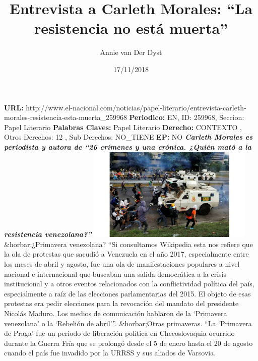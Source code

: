 \documentclass{article}%
\title{\textbf{Entrevista a Carleth Morales: “La resistencia no está muerta”}}%
\author{Annie van Der Dyst}%
\date{17/11/2018}%
\begin{document}
%
\normalsize%
\maketitle%
\textbf{URL: }%
http://www.el{-}nacional.com/noticias/papel{-}literario/entrevista{-}carleth{-}morales{-}resistencia{-}esta{-}muerta\_259968\newline%
%
\textbf{Periodico: }%
EN, %
ID: %
259968, %
Seccion: %
Papel Literario\newline%
%
\textbf{Palabras Claves: }%
Papel Literario\newline%
%
\textbf{Derecho: }%
CONTEXTO%
, Otros Derechos: %
12%
, Sub Derechos: %
NO\_TIENE%
\newline%
%
\textbf{EP: }%
NO\newline%
\newline%
%
\textbf{\textit{Carleth Morales es periodista y autora de “26 crímenes y una crónica. ¿Quién mató a la resistencia venezolana?”}}%
\newline%
\newline%
%
\includegraphics[width=300px]{210.jpg}%
\newline%
%
\&horbar;¿Primavera venezolana?%
\newline%
%
“Si consultamos Wikipedia esta nos refiere que la ola de protestas que sacudió a Venezuela en el año 2017, especialmente entre los meses de abril y agosto, fue una ola de manifestaciones populares a nivel nacional e internacional que buscaban una salida democrática a la crisis institucional y a otros eventos relacionados con la conflictividad política del país, especialmente a raíz de las elecciones parlamentarias del 2015. El objeto de esas protestas era pedir elecciones para la revocación del mandato del presidente Nicolás Maduro.%
\newline%
%
Los medios de comunicación hablaron de la ‘Primavera venezolana’ o la ‘Rebelión de abril’”.%
\newline%
%
\&horbar;Otras primaveras.%
\newline%
%
“La ‘Primavera de Praga’ fue un periodo de liberación política en Checoslovaquia ocurrido durante la Guerra Fría que se prolongó desde el 5 de enero hasta el 20 de agosto cuando el país fue invadido por la URRSS y sus aliados de Varsovia.%
\end{document}
